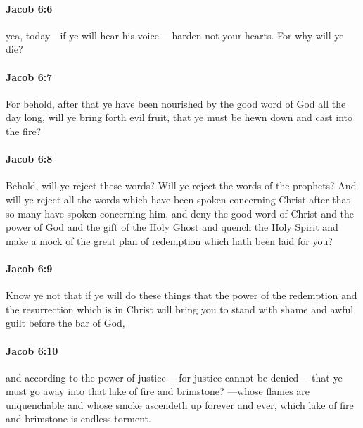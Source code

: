 		\paragraph{Jacob 6:6} %
			\label{JACOB-6-6}

			yea, today---if ye will hear his voice---
			harden not your hearts.
			For why will ye die?

		\paragraph{Jacob 6:7} %
			\label{JACOB-6-7}

			For behold, after that ye have been nourished
			by the good word of God all the day long,
			will ye bring forth evil fruit,
			that ye must be hewn down and cast into the fire?

		\paragraph{Jacob 6:8} %
			\label{JACOB-6-8}

			Behold, will ye reject these words?
			Will ye reject the words of the prophets?
			And will ye reject all the words
			which have been spoken concerning Christ
			after that so many have spoken concerning him,
			and deny the good word of Christ and the power of God
			and the gift of the Holy Ghost
			and quench the Holy Spirit
			and make a mock of the great plan of redemption
			which hath been laid for you?

		\paragraph{Jacob 6:9} %
			\label{JACOB-6-9}

			Know ye not that if ye will do these things
			that the power of the redemption and the resurrection which is in Christ
			will bring you to stand with shame and awful guilt before the bar of God,

		\paragraph{Jacob 6:10} %
			\label{JACOB-6-10}

			and according to the power of justice
			---for justice cannot be denied---
			that ye must go away into that lake of fire and brimstone?
			---whose flames are unquenchable
			and whose smoke ascendeth up forever and ever,
			which lake of fire and brimstone is endless torment.

